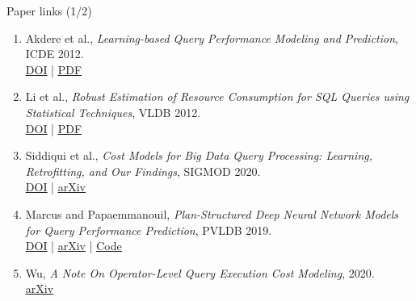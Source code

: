 \documentclass[aspectratio=169,10pt]{beamer}
\newcommand{\paperlink}[2]{\href{#1}{\textcolor{WayangTeal}{\underline{#2}}}}
\begin{document}
\begin{frame}[shrink=10]{Paper links (1/2)}
\small
\begin{enumerate}\setlength\itemsep{5pt}
\item Akdere et al., \emph{Learning-based Query Performance Modeling and Prediction}, ICDE 2012.\\
\paperlink{https://doi.org/10.1109/ICDE.2012.64}{DOI} \;|\; \paperlink{https://cs.brown.edu/people/ugur/icde12_learning.pdf}{PDF}
\item Li et al., \emph{Robust Estimation of Resource Consumption for SQL Queries using Statistical Techniques}, VLDB 2012.\\
\paperlink{https://doi.org/10.14778/2350229.2350269}{DOI} \;|\; \paperlink{https://www.microsoft.com/en-us/research/wp-content/uploads/2016/02/Resource.pdf}{PDF}
\item Siddiqui et al., \emph{Cost Models for Big Data Query Processing: Learning, Retrofitting, and Our Findings}, SIGMOD 2020.\\
\paperlink{https://doi.org/10.1145/3318464.3380584}{DOI} \;|\; \paperlink{https://arxiv.org/abs/2002.12393}{arXiv}
\item Marcus and Papaemmanouil, \emph{Plan-Structured Deep Neural Network Models for Query Performance Prediction}, PVLDB 2019.\\
\paperlink{https://doi.org/10.14778/3368289.3368296}{DOI} \;|\; \paperlink{https://arxiv.org/abs/1902.00132}{arXiv} \;|\; \paperlink{https://github.com/rabbit721/QPPNet}{Code}
\item Wu, \emph{A Note On Operator-Level Query Execution Cost Modeling}, 2020.\\
\paperlink{https://arxiv.org/abs/2003.04410}{arXiv}
\end{enumerate}
\end{frame}
\end{document}
